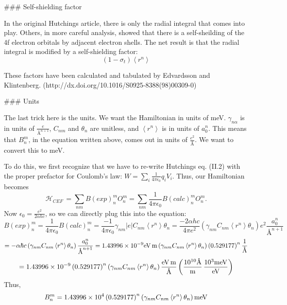 ### Self-shielding factor

In the original Hutchings article, there is only the radial integral
that comes into play. Others, in more careful analysis, showed that
there is a self-sheilding of the 4f electron orbitals by adjacent
electron shells. The net result is that the radial integral is modified
by a self-shielding factor:
$$
(1-\sigma_{t})\left\langle r^{n}\right\rangle 
$$

These factors have been calculated and tabulated by Edvardsson and
Klintenberg. (http://dx.doi.org/10.1016/S0925-8388(98)00309-0)

### Units

The last trick here is the units. We want the Hamiltonian in units
of meV. $\gamma_{n\alpha}$ is in units of $\frac{e}{\textrm{Å}^{n+1}}$,
$C_{nm}$ and $\theta_{n}$ are unitless, and $\left\langle r^{n}\right\rangle $
is in units of $a_{0}^{n}$. This means that $B_{n}^{m}$, in the equation written above, comes out
in units of $\frac{e^{2}}{\textrm{Å}}$. We want to convert this to
meV.

To do this, we first recognize that we have to re-write Hutchings
eq. (II.2) with the proper prefactor for Coulomb's law: $W=\sum_{i}\frac{1}{4\pi\epsilon_{0}}q_{i}V_{i}$. Thus,
our Hamiltonian becomes
$$
\mathcal{H}_{CEF}\,=\sum_{nm}B(exp)_{n}^{m}O_{n}^{m}=\sum_{nm}\frac{1}{4\pi\epsilon_{0}}B(calc)_{n}^{m}O_{n}^{m}.
$$
Now $\epsilon_{0}=\frac{e^{2}}{2\alpha hc}$, so we can directly plug this into the equation:
$$
B(exp)_{n}^{m}=\frac{1}{4\pi\epsilon_{0}}B(calc)_{n}^{m}=\frac{-1}{4\pi\epsilon_{0}}\gamma_{nm}|e|C_{nm}\left\langle r^{n}\right\rangle \theta_{n}=\frac{-2\alpha hc}{4\pi e^{2}}\left(\gamma_{nm}C_{nm}\left\langle r^{n}\right\rangle \theta_{n}\right)e^{2}\frac{a_{0}^{n}}{\textrm{Å}^{n+1}}
$$
$$
=-\alpha\hbar c\left(\gamma_{nm}C_{nm}\left\langle r^{n}\right\rangle \theta_{n}\right)\frac{a_{0}^{n}}{\textrm{Å}^{n+1}}=1.43996\times10^{-9}{\rm eV\,m}\left(\gamma_{nm}C_{nm}\left\langle r^{n}\right\rangle \theta_{n}\right)\left(0.529177\right)^{n}{\rm \frac{1}{\textrm{Å}}}
$$
$$
=1.43996\times10^{-9}\left(0.529177\right)^{n}\left(\gamma_{nm}C_{nm}\left\langle r^{n}\right\rangle \theta_{n}\right){\rm \frac{{\rm eV\,m}}{\textrm{Å}}}\left(\frac{10^{10}{\rm \textrm{Å}}}{{\rm m}}\,\frac{10^{3}{\rm meV}}{{\rm eV}}\right)
$$
Thus,
$$
B_{n}^{m}=1.43996\times10^{4}\left(0.529177\right)^{n}\left(\gamma_{nm}C_{nm}\left\langle r^{n}\right\rangle \theta_{n}\right){\rm meV}
$$
